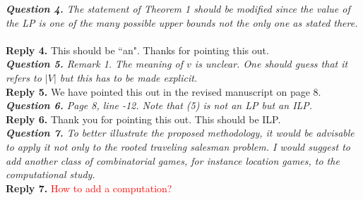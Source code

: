 \documentclass[11pt]{article}
\begin{document}
%
%
%
\noindent \textit{\textbf{Question 4.}
The statement of Theorem 1 should be modified since the value of the
LP is one of the many possible upper bounds not the only one as stated
there.
}
~\\[2mm]
\noindent \textbf{Reply 4.}
This should be ``an". Thanks for pointing this out.
~\\[4mm]
%
%
%
\noindent \textit{\textbf{Question 5.}
Remark 1. The meaning of $v$ is unclear. One should guess that it refers
to $|V|$ but this has to be made explicit.
}
\\[2mm]
\noindent \textbf{Reply 5.}
We have pointed this out in the revised manuscript on page 8.
\\[4mm]
%
%
%
\noindent \textit{\textbf{Question 6.}
Page 8, line -12. Note that (5) is not an LP but an ILP.
}
\\[2mm]
\noindent \textbf{Reply 6.}
Thank you for pointing this out.
This should be ILP.
\\[4mm]
%
%
%
\noindent \textit{\textbf{Question 7.}
To better illustrate the proposed methodology, it would be advisable
to apply it not only to the rooted traveling salesman problem. I would
suggest to add another class of combinatorial games, for instance location games, to the computational study.}
\\[2mm]
\noindent \textbf{Reply 7.}
\textcolor{red}{How to add a computation?}
\\[4mm]
%
%
\end{document}
